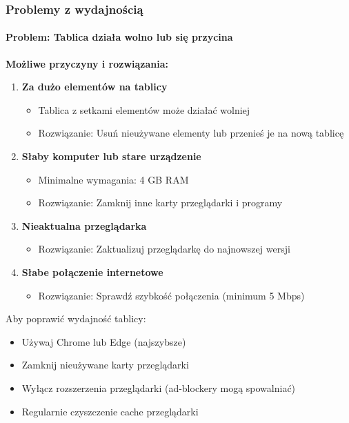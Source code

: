 \documentclass[12pt,a4paper]{article}
\begin{document}
\subsubsection{Problemy z wydajnością}

\paragraph{Problem: Tablica działa wolno lub się przycina}

\textbf{Możliwe przyczyny i rozwiązania:}

\begin{enumerate}
    \item \textbf{Za dużo elementów na tablicy}
    \begin{itemize}
        \item Tablica z setkami elementów może działać wolniej
        \item Rozwiązanie: Usuń nieużywane elementy lub przenieś je na nową tablicę
    \end{itemize}
    
    \item \textbf{Słaby komputer lub stare urządzenie}
    \begin{itemize}
        \item Minimalne wymagania: 4 GB RAM
        \item Rozwiązanie: Zamknij inne karty przeglądarki i programy
    \end{itemize}
    
    \item \textbf{Nieaktualna przeglądarka}
    \begin{itemize}
        \item Rozwiązanie: Zaktualizuj przeglądarkę do najnowszej wersji
    \end{itemize}
    
    \item \textbf{Słabe połączenie internetowe}
    \begin{itemize}
        \item Rozwiązanie: Sprawdź szybkość połączenia (minimum 5 Mbps)
    \end{itemize}
\end{enumerate}

\begin{tcolorbox}[colback=green!5!white,colframe=green!75!black,title=\faLightbulb\ Optymalizacja wydajności]
Aby poprawić wydajność tablicy:
\begin{itemize}
    \item Używaj Chrome lub Edge (najszybsze)
    \item Zamknij nieużywane karty przeglądarki
    \item Wyłącz rozszerzenia przeglądarki (ad-blockery mogą spowalniać)
    \item Regularnie czyszczenie cache przeglądarki
\end{itemize}
\end{tcolorbox}
\end{document}
